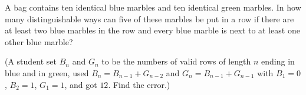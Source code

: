 A bag contains ten identical blue marbles and ten identical green marbles. In how many distinguishable ways can five of these marbles be put in a row if there are at least two blue marbles in the row and every blue marble is next to at least one other blue marble?

(A student set $B_n$ and $G_n$ to be the numbers of valid rows of length $n$ ending in blue and in green, used $B_n=B_{n-1}+G_{n-2}$ and $G_n=B_{n-1}+G_{n-1}$ with $B_1=0$, $B_2=1$, $G_1=1$, and got $12$. Find the error.)
